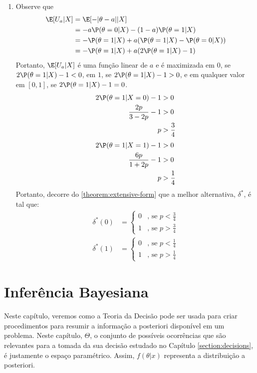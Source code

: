 {\begin{enumerate}[label=(\alph*)]
  \item Observe que
  \begin{align*}
   \E[U_{a}|X]
   &= \E[-|\theta-a||X] \\
   &= -a\P(\theta=0|X) -(1-a)\P(\theta=1|X) \\
   &= -\P(\theta=1|X)
   +a(\P(\theta=1|X)-\P(\theta=0|X)) \\
   &= -\P(\theta=1|X) +a(2\P(\theta=1|X)-1)
  \end{align*}
  Portanto, $\E[U_{a}|X]$ é uma função linear de $a$ e
  é maximizada em $0$, se $2\P(\theta=1|X)-1 < 0$,
  em $1$, se $2\P(\theta=1|X)-1 > 0$, e
  em qualquer valor em $[0,1]$, se 
  $2\P(\theta=1|X)-1=0$.
  \begin{align*}
   2\P(\theta=1|X=0)-1 &> 0 \\
   \frac{2p}{3-2p}-1 &> 0 \\
   p &> \frac{3}{4}
  \end{align*}
  \begin{align*}
   2\P(\theta=1|X=1)-1 &> 0 \\
   \frac{6p}{1+2p}-1 &> 0 \\
   p &> \frac{1}{4}
  \end{align*}
  Portanto, decorre do \cref{theorem:extensive-form} que
  a melhor alternativa, $\delta^{*}$, é tal que:
  \begin{align*}
   \delta^{*}(0) &=
   \begin{cases}
    0 & \text{, se $p < \frac{3}{4}$} \\
    1 & \text{, se $p > \frac{3}{4}$}
   \end{cases}
  \end{align*}
  \begin{align*}
   \delta^{*}(1) &=
   \begin{cases}
    0 & \text{, se $p < \frac{1}{4}$} \\
    1 & \text{, se $p > \frac{1}{4}$}
   \end{cases}
  \end{align*}
 \end{enumerate}
}{}

 

\section{Inferência Bayesiana}

Neste capítulo, veremos como
a Teoria da Decisão pode ser usada para
criar procedimentos para resumir a informação a posteriori disponível em um problema. Neste capítulo, $\Theta$,
o conjunto de possíveis ocorrências
que são relevantes para a tomada da sua decisão estudado no Capítulo \ref{section:decisions}, é justamente o espaço paramétrico.
Assim, $f(\theta|x)$
representa a distribuição a posteriori.

